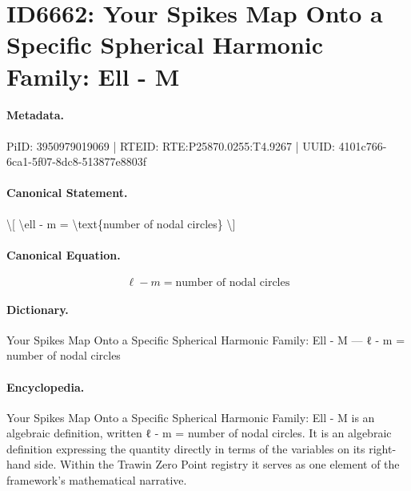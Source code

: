 \section*{ID6662: Your Spikes Map Onto a Specific Spherical Harmonic Family: Ell - M}
\paragraph{Metadata.}
PiID: 3950979019069 | RTEID: RTE:P25870.0255:T4.9267 | UUID: 4101c766-6ca1-5f07-8dc8-513877e8803f

\paragraph{Canonical Statement.}
\textbackslash{}[ \textbackslash{}ell - m = \textbackslash{}text\{number of nodal circles\} \textbackslash{}]

\paragraph{Canonical Equation.}
\[
\ell - m = \text{number of nodal circles}
\]

\paragraph{Dictionary.}
Your Spikes Map Onto a Specific Spherical Harmonic Family: Ell - M — ℓ - m = number of nodal circles

\paragraph{Encyclopedia.}
Your Spikes Map Onto a Specific Spherical Harmonic Family: Ell - M is an algebraic definition, written ℓ - m = number of nodal circles. It is an algebraic definition expressing the quantity directly in terms of the variables on its right-hand side. Within the Trawin Zero Point registry it serves as one element of the framework's mathematical narrative.
